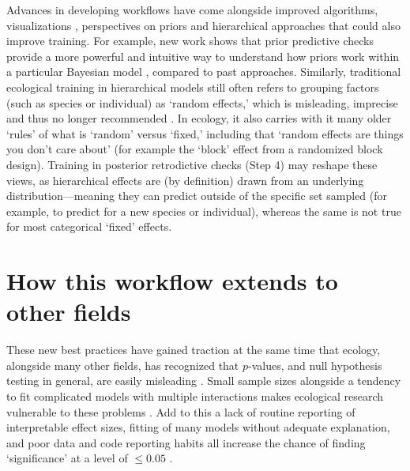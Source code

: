\documentclass[11pt]{article}
\begin{document}
Advances in developing workflows have come alongside improved algorithms, visualizations \citep[e.g.][]{betanworkflow,vandeschoot2021,gabryvis}, perspectives on priors \citep{BDA,regotherstories,betanprior}  and hierarchical approaches that could also improve training. %
For example, new work shows that prior predictive checks provide a more powerful and intuitive way to understand how priors work within a particular Bayesian model \citep{betanprior}, compared to past approaches. Similarly, traditional ecological training in hierarchical models still often refers to grouping factors (such as species or individual) as `random effects,' which is misleading, imprecise and thus no longer recommended \citep{gelmanhill}. In ecology, it also carries with it many older `rules' of what is `random' versus `fixed,' including that `random effects are things you don't care about' (for example the `block' effect from a randomized block design). Training in posterior retrodictive checks (Step 4) may reshape these views, as hierarchical effects are (by definition) drawn from an underlying distribution---meaning they can predict outside of the specific set  sampled (for example, to predict for a new species or individual), whereas the same is not true for most categorical `fixed' effects.

\section*{How this workflow extends to other fields} 

These new best practices have gained traction at the same time that ecology, alongside many other fields, has recognized that $p$-values, and null hypothesis testing in general, are easily misleading \citep{gelman2017statistical,ferraro2020feature,filazzola2021replication,fraser2020role}. Small sample sizes alongside a tendency to fit complicated models with multiple interactions makes ecological research vulnerable to these problems \citep{gelman2015connection}. Add to this a lack of routine reporting of interpretable effect sizes, fitting of many models without adequate explanation, and poor data and code reporting habits all increase the chance of finding `significance' at a level of $\le0.05$ \citep{halsey2015,loken2017}. 
\end{document}
